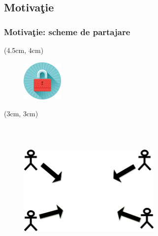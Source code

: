 \documentclass{beamer}
\theoremstyle{definition}
\begin{document}
\subsection{Motiva\c{t}ie}
\begin{frame}
    \frametitle{Motiva\c{t}ie: scheme de partajare} %
     {
        \begin{textblock*}{4cm}(4.5cm, 4cm)
        \begin{figure}
            \includegraphics[width=2cm,height=2cm,keepaspectratio]{img/motivation/Lock.png}
        \end{figure}
        \end{textblock*}
    }
     {
        \begin{textblock*}{4cm}(3cm, 3cm)
        \begin{figure}
            \includegraphics[width=7cm,height=7cm,keepaspectratio]{img/motivation/all_in.png}
        \end{figure}
        \end{textblock*}

}
\end{frame}
\end{document}

